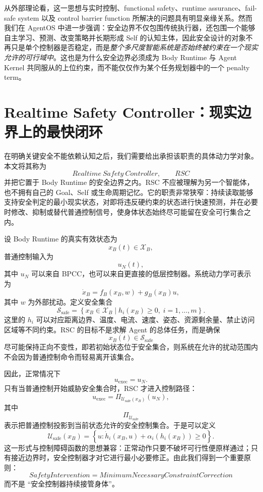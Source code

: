 从外部理论看，这一思想与实时控制、functional safety、runtime assurance、fail-safe system 以及 control barrier function 所解决的问题具有明显亲缘关系。然而我们在 AgentOS 中进一步强调：安全边界不仅包围传统执行器，还包围一个能够自主学习、预测、改变策略并长期形成 Self 的认知主体，因此安全设计的对象不再只是单个控制器是否稳定，而是\emph{整个多尺度智能系统是否始终被约束在一个现实允许的可行域中}。这也是为什么安全边界必须成为 Body Runtime 与 Agent Kernel 共同服从的上位约束，而不能仅仅作为某个任务规划器中的一个 penalty term。

\section{Realtime Safety Controller：现实边界上的最快闭环}

在明确关键安全不能依赖认知之后，我们需要给出承担该职责的具体动力学对象。本文将其称为
\[
\boxed{
Realtime\ Safety\ Controller,\qquad RSC
}
\]
并把它置于 Body Runtime 的安全边界之内。RSC 不应被理解为另一个智能体，也不拥有自己的 Goal、Self 或生命周期记忆。它的职责非常狭窄：持续读取能够支持安全判定的最小现实状态，对即将违反硬约束的状态进行快速预测，并在必要时修改、抑制或替代普通控制信号，使身体状态始终尽可能留在安全可行集合之内。

设 Body Runtime 的真实有效状态为
\[
x_B(t)\in\mathcal X_B,
\]
普通控制输入为
\[
u_N(t),
\]
其中 $u_N$ 可以来自 BPCC，也可以来自更直接的低层控制器。系统动力学可表示为
\[
\dot x_B
=
f_B(x_B,w)
+
g_B(x_B)u,
\]
其中 $w$ 为外部扰动。定义安全集合
\[
\mathcal S_{\mathrm{safe}}
=
\left\{
x_B\in\mathcal X_B
\mid
h_i(x_B)\geq 0,\;
i=1,\ldots,m
\right\}.
\]
这里的 $h_i$ 可以对应距离边界、温度、电流、速度、姿态、资源剩余量、禁止访问区域等不同约束。RSC 的目标不是求解 Agent 的总体任务，而是确保
\[
x_B(t)\in\mathcal S_{\mathrm{safe}}
\]
尽可能保持正向不变性，即若初始状态位于安全集合，则系统在允许的扰动范围内不会因为普通控制命令而轻易离开该集合。

因此，正常情况下
\[
u_{\mathrm{exec}}
=
u_N.
\]
只有当普通控制开始威胁安全集合时，RSC 才进入控制路径：
\[
u_{\mathrm{exec}}
=
\Pi_{\mathcal U_{\mathrm{safe}}(x_B)}
\left(
u_N
\right),
\]
其中
\[
\Pi_{\mathcal U_{\mathrm{safe}}}
\]
表示把普通控制投影到当前状态允许的安全控制集合。于是可以定义
\[
\mathcal U_{\mathrm{safe}}(x_B)
=
\left\{
u:
\dot h_i(x_B,u)
+
\alpha_i(h_i(x_B))
\geq0
\right\}.
\]
这一形式与控制障碍函数的思想兼容：正常动作只要不破坏可行性便原样通过；只有接近边界时，安全控制器才对它进行最小必要修正。由此我们得到一个重要原则：
\[
\boxed{
SafetyIntervention
=
MinimumNecessaryConstraintCorrection
}
\]
而不是 ``安全控制器持续接管身体''。

